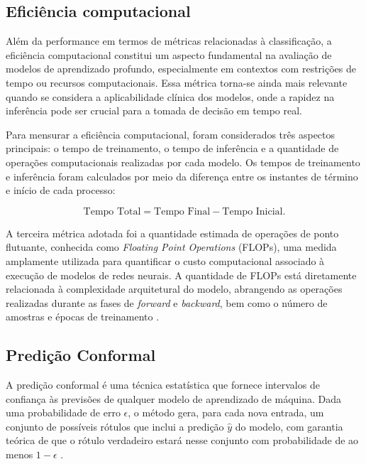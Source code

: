 \subsection{Eficiência computacional}

Além da performance em termos de métricas relacionadas à classificação, a eficiência computacional constitui um aspecto fundamental na avaliação de modelos de aprendizado profundo, especialmente em contextos com restrições de tempo ou recursos computacionais. Essa métrica torna-se ainda mais relevante quando se considera a aplicabilidade clínica dos modelos, onde a rapidez na inferência pode ser crucial para a tomada de decisão em tempo real.

Para mensurar a eficiência computacional, foram considerados três aspectos principais: o tempo de treinamento, o tempo de inferência e a quantidade de operações computacionais realizadas por cada modelo. Os tempos de treinamento e inferência foram calculados por meio da diferença entre os instantes de término e início de cada processo:

\begin{equation}
    \text{Tempo Total} = \text{Tempo Final} - \text{Tempo Inicial} \text{.}
\end{equation}

A terceira métrica adotada foi a quantidade estimada de operações de ponto flutuante, conhecida como \textit{Floating Point Operations} (FLOPs), uma medida amplamente utilizada para quantificar o custo computacional associado à execução de modelos de redes neurais. A quantidade de FLOPs está diretamente relacionada à complexidade arquitetural do modelo, abrangendo as operações realizadas durante as fases de \textit{forward} e \textit{backward}, bem como o número de amostras e épocas de treinamento \cite{Lohn2022}.

\subsection{Predição Conformal} \label{sec:conformal-prediction}

A predição conformal é uma técnica estatística que fornece intervalos de confiança às previsões de qualquer modelo de aprendizado de máquina. Dada uma probabilidade de erro $\epsilon$, o método gera, para cada nova entrada, um conjunto de possíveis rótulos que inclui a predição $\hat{y}$ do modelo, com garantia teórica de que o rótulo verdadeiro estará nesse conjunto com probabilidade de ao menos $1 - \epsilon$ \cite{angelopoulos2021gentle}.

